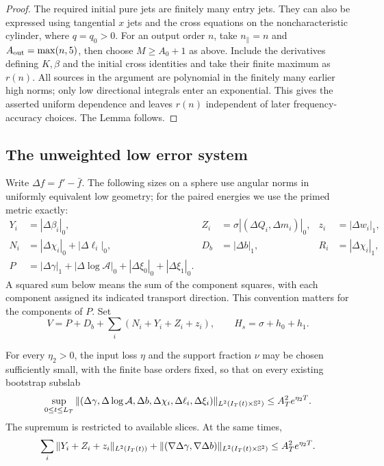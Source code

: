 \begin{proof}
The required initial pure jets are finitely many entry jets.  They
can also be expressed using tangential $x$ jets and the cross
equations on the noncharacteristic cylinder, where $q=q_0>0$.
For an output order $n$, take $n_{\parallel}=n$ and
$A_{\rm out}=\max(n,5)$, then choose $M\ge A_0+1$ as above.
Include the derivatives defining $K,\beta$ and the initial cross
identities and take their finite maximum as $r(n)$.  All sources in
the argument are polynomial in the finitely many earlier high norms;
only low directional integrals enter an exponential.  This gives
the asserted uniform dependence and leaves $r(n)$ independent of
later frequency-accuracy choices.  The Lemma follows.
\end{proof}

\subsection{The unweighted low error system}

Write $\Delta f=f'-\bar f$.  The following sizes on a sphere use
angular norms in uniformly equivalent low geometry; for the paired
energies we use the primed metric exactly:
\begin{equation}\label{dn:low-sizes}
\begin{aligned}
 Y_i&=|\Delta\beta_i|_0,&
 Z_i&=\sigma|(\Delta Q_i,\Delta m_i)|_0,&
 z_i&=|\Delta w_i|_1,\\
 N_i&=|\Delta\chi_i|_0+|\Delta\ell_i|_0,&
 D_b&=|\Delta b|_1,&R_i&=|\Delta\chi_i|_1,\\
 P&=|\Delta\gamma|_1+|\Delta\log\mathcal A|_0
                              +|\Delta\xi_0|_0+|\Delta\xi_1|_0.
\end{aligned}
\end{equation}
A squared sum below means the sum of the component squares, with
each component assigned its indicated transport direction.  This
convention matters for the components of $P$.
Set
\[
 V=P+D_b+\sum_i(N_i+Y_i+Z_i+z_i),\qquad
                             H_s=\sigma+h_0+h_1.
\]

\begin{proposition}\label{prop:dn-low-error}
For every $\eta_2>0$, the input loss $\eta$ and the support fraction
$\nu$ may be chosen sufficiently small, with the finite base orders
fixed, so that on every existing bootstrap subslab
\begin{equation}\label{dn:low-conclusion}
 \sup_{0\le t\le L_T}
 \| (\Delta\gamma,\Delta\log\mathcal A,\Delta b,
                   \Delta\chi_i,\Delta\ell_i,\Delta\xi_i)
                         \|_{L^2(I_T(t)\times\mathbb S^2)}
 \le A_T^2e^{\eta_2T}.
\end{equation}
The supremum is restricted to available slices. At the same times,
\begin{equation}\label{dn:low-auxiliary-conclusion}
 \sum_i\|Y_i+Z_i+z_i\|_{L^2(I_T(t))}
 +\|(\nabla\Delta\gamma,\nabla\Delta b)
                  \|_{L^2(I_T(t)\times\mathbb S^2)}
 \le A_T^2e^{\eta_2T}.
\end{equation}
\end{proposition}

